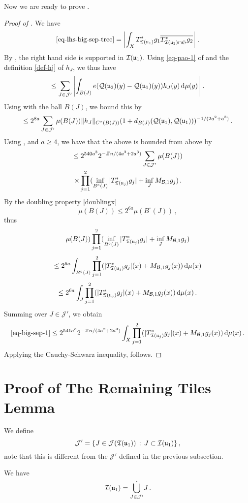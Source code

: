     Now we are ready to prove .
    \begin{proof}[Proof of ]
    We have
    $$
        \eqref{eq-lhs-big-sep-tree} = \left| \int_{X} T_{{\mathfrak T}({\mathfrak u}_1)}^* g_1 \overline{T_{{\mathfrak T}({\mathfrak u}_2) \cap \mathfrak{S}}^* g_2 }\right|\,.
    $$
    By , the right hand side is supported in ${\mathcal{I}}({\mathfrak u}_1)$. Using \eqref{eq-pao-1} of  and the definition \eqref{def-hj} of $h_J$, we thus have
    $$
        \le \sum_{J \in \mathcal{J}'} \left|\int_{B(J)} e({\mathcal{Q}}({\mathfrak u}_2)(y) - {\mathcal{Q}}({\mathfrak u}_1)(y)) h_J(y) \, \mathrm{d}\mu(y) \right|\,.
    $$
    Using  with the ball $B(J)$, we bound this by
    $$
        \le 2^{8a} \sum_{J \in \mathcal{J}'} \mu(B(J)) \|h_J\|_{C^{\tau}(B(J))} (1 + d_{B(J)}({\mathcal{Q}}({\mathfrak u}_1), {\mathcal{Q}}({\mathfrak u}_1)))^{-1/(2a^2+a^3)}\,.
    $$
    Using ,  and $a \ge 4$, we have that the above is bounded from above by
    \begin{multline}
        \label{eq-big-sep-1}
        \le 2^{540a^3} 2^{-Zn/(4a^2 + 2a^3)} \sum_{J \in \mathcal{J}'} \mu(B(J)) \\
        \times \prod_{j=1}^2 (\inf_{B^\circ{}(J)} |T_{{\mathfrak T}({\mathfrak u}_j)}^* g_j| + \inf_J M_{\mathcal{B},1} g_j)\,.
    \end{multline}
    By the doubling property \eqref{doublingx}
    $$
        \mu(B(J)) \le 2^{6a} \mu(B^\circ{}(J))\,,
    $$
    thus
    $$
        \mu(B(J)) \prod_{j=1}^2 (\inf_{B^\circ{}(J)} |T_{{\mathfrak T}({\mathfrak u}_j)}^* g_j| + \inf_J M_{\mathcal{B},1} g_j)
    $$
    $$
        \le 2^{6a} \int_{B^\circ{}(J)} \prod_{j=1}^2 ( |T_{{\mathfrak T}({\mathfrak u}_j)}^* g_j|(x) + M_{\mathcal{B},1} g_j(x)) \, \mathrm{d}\mu(x)
    $$
    $$
        \le 2^{6a} \int_J \prod_{j=1}^2 ( |T_{{\mathfrak T}({\mathfrak u}_j)}^* g_j|(x) + M_{\mathcal{B},1} g_j(x)) \, \mathrm{d}\mu(x)\,.
    $$
    Summing over $J \in \mathcal{J}'$, we obtain
    $$
        \eqref{eq-big-sep-1} \le 2^{541a^3} 2^{-Zn/(4a^2 + 2a^3)} \int_X \prod_{j=1}^2 ( |T_{{\mathfrak T}({\mathfrak u}_j)}^* g_j|(x) + M_{\mathcal{B},1} g_j(x)) \, \mathrm{d}\mu(x)\,.
    $$
    Applying the Cauchy-Schwarz inequality,  follows.
    \end{proof}

\section{Proof of The Remaining Tiles Lemma}
    \label{subsec-rest-tiles}
    We define
    $$
        \mathcal{J}' = \{J \in \mathcal{J}({\mathfrak T}({\mathfrak u}_1)) \, : \, J \subset {\mathcal{I}}({\mathfrak u}_1)\}\,,
    $$
    note that this is different from the $\mathcal{J}'$ defined in the previous subsection.
    \begin{lemma}
        \label{dyadic-partition-2}
        \leanok
        We have
        $$
            {\mathcal{I}}({\mathfrak u}_1) = \dot{\bigcup_{J \in \mathcal{J}'}} J\,.
        $$
    \end{lemma}

